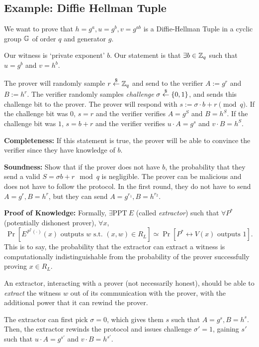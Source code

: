 \subsection{Example: Diffie Hellman Tuple}

We want to prove that $h = g^a, u = g^b, v = g^{ab}$ is a Diffie-Hellman Tuple in a cyclic group $\mathbb G$ of order $q$ and generator $g$.

Our witness is `private exponent' $b$. Our statement is that $\exists b\in \mathbb Z_q$ such that $u = g^b$ and $v = h^b$.


The prover will randomly sample $r\overset{\$}{\leftarrow} \mathbb Z_q$ and send to the verifier $A:=g^r$ and $B:=h^r$. The verifier randomly samples \emph{challenge} $\sigma \overset{\$}{\leftarrow} \{0, 1\}$, and sends this challenge bit to the prover. The prover will respond with $s := \sigma\cdot b + r\pmod{q}$. If the challenge bit was $0$, $s = r$ and the verifier verifies $A = g^S$ and $B = h^S$. If the challenge bit was $1$, $s = b + r$ and the verifier verifies $u\cdot A = g^s$ and $v\cdot B = h^S$.

\textbf{Completeness:} If this statement is true, the prover will be able to convince the verifier since they have knowledge of $b$.

\textbf{Soundness:} Show that if the prover does not have $b$, the probability that they send a valid $S = \sigma b + r \mod q$ is negligible. The prover can be malicious and does not have to follow the protocol. In the first round, they do not have to send $A = g^r, B = h^r$, but they can send $A = g^{r_1}, B= h^{r_2}$.

\textbf{Proof of Knowledge:} Formally, $\exists \mathrm{PPT}\ E$ (called \emph{extractor}) such that $\forall P^*$ (potentially dishonest prover), $\forall x$,
\[\Pr[E^{P^*(\cdot)}(x) \text{ outputs }w\text{ s.t. }(x, w)\in R_L] \simeq \Pr[P^*\leftrightarrow V(x)\text{ outputs }1].\]
This is to say, the probability that the extractor can extract a witness is computationally indistinguishable from the probability of the prover successfully proving $x\in R_L$.

An extractor, interacting with a prover (not necessarily honest), should be able to \emph{extract} the witness $w$ out of its communication with the prover, with the additional power that it can rewind the prover.


The extractor can first pick $\sigma = 0$, which gives them $s$ such that $A = g^s, B = h^s$. Then, the extractor rewinds the protocol and issues challenge $\sigma' = 1$, gaining $s'$ such that $u\cdot A = g^{s'}$ and $v\cdot B = h^{s'}$.

